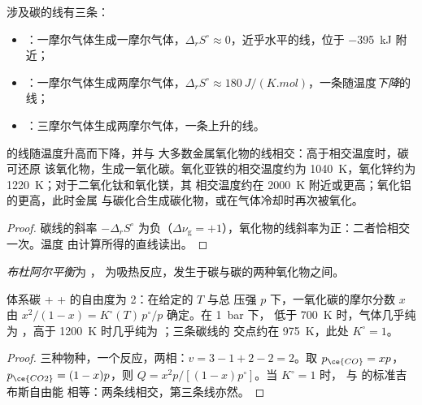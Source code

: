 涉及碳的线有三条：
\begin{itemize}
  \item {}：一摩尔气体生成一摩尔气体，$\Delta_r S^\circ
        \approx 0$，近乎水平的线，位于 \qty{-395}{kJ} 附近；
  \item {}：一摩尔气体生成两摩尔气体，$\Delta_r S^\circ
        \approx \qty{+180}{J/(K.mol)}$，一条随温度\emph{下降}的线；
  \item {}：三摩尔气体生成两摩尔气体，一条上升的线。
\end{itemize}

\begin{proposition}[高温下碳几乎可还原一切]\label{prop:b2:ellingham:carbon}
 的线随温度升高而下降，并与
大多数金属氧化物的线相交：高于相交温度时，碳可还原
该氧化物，生成一氧化碳。氧化亚铁的相交温度约为
\qty{1040}{K}，氧化锌约为 \qty{1220}{K}；对于二氧化钛和氧化镁，其
相交温度约在 \qty{2000}{K} 附近或更高；氧化铝的更高，此时金属
与碳化合生成碳化物，或在气体冷却时再次被氧化。
\end{proposition}

\begin{proof}
碳线的斜率 $-\Delta_r S^\circ$ 为负（$\Delta\nu_{\text{g}}
= +1$），氧化物的线斜率为正：二者恰相交一次。温度
由计算所得的直线读出。
\end{proof}

\begin{definition}[布杜阿尔平衡]\label{def:b2:ellingham:boudouard}
\emph{布杜阿尔平衡}为 ，
为吸热反应，发生于碳与碳的两种氧化物之间。
\end{definition}

\begin{proposition}[碳上方气体的组成]\label{prop:b2:ellingham:boudouard}
体系碳 +  +  的自由度为 2：在给定的 $T$ 与总
压强 $p$ 下，一氧化碳的摩尔分数 $x$ 由 $x^2/(1 - x)
= K^\circ(T)\,p^\circ/p$ 确定。在 \qty{1}{bar} 下，
低于 \qty{700}{K} 时，气体几乎纯为 ，高于 \qty{1200}{K} 时几乎纯为 ；三条碳线的
交点约在 \qty{975}{K}，此处 $K^\circ = 1$。
\end{proposition}

\begin{proof}
三种物种，一个反应，两相：$v = 3 - 1 + 2 - 2 = 2$。取 $p_{\ce{CO}}
= xp$，$p_{\ce{CO2}} = (1 - x)p$，则 $Q = x^2p/[(1 - x)p^\circ]$。当 $K^\circ = 1$ 时，
 与  的标准吉布斯自由能
相等：两条线相交，第三条线亦然。
\end{proof}

